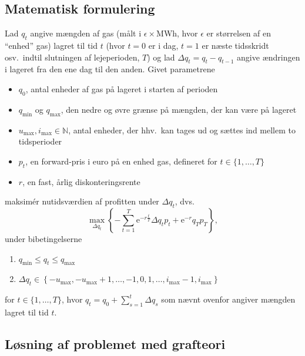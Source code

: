 \documentclass[12pt,oneside,final]{article}
\newcommand{\N}{\mathbb{N}}
\newcommand{\1}{\mathbbm{1}}
\newcommand{\e}{\mathrm{e}}
\begin{document}
\subsection{Matematisk formulering}

Lad \(q_{t}\) angive mængden af gas (målt i \(\epsilon\times\)MWh, hvor \(\epsilon\) er størrelsen af en ``enhed'' gas) lagret til tid \(t\) (hvor \(t = 0\) er i dag, \(t = 1\) er næste tidsskridt osv.\ indtil slutningen af lejeperioden, \(T\)) og lad \(\Delta q_{t} = q_{t} - q_{t-1}\) angive ændringen i lageret fra den ene dag til den anden.
Givet parametrene
%
\begin{itemize}
\item \(q_{0}\), antal enheder af gas på lageret i starten af perioden
\item \(q_{\min}\) og \(q_{\max}\), den nedre og øvre grænse på mængden, der kan være på lageret
\item \(u_{\max}, i_{\max} \in \N\), antal enheder, der hhv.\ kan tages ud og sættes ind mellem to tidsperioder
\item \(p_{t}\), en forward-pris i euro på en enhed gas, defineret for \(t \in \{1, \dotsc, T\}\)
\item \(r\), en fast, årlig diskonteringsrente
\end{itemize}
%
maksimér nutidsværdien af profitten under \(\Delta q_{t}\), dvs.\
%
\begin{equation}
  \label{eq:1}
  \max_{\Delta q_{t}}
  \left\{
    - \sum_{t = 1}^{T} \e^{-r\tfrac{t}{T}} \Delta q_{t} p_{t} + \e^{-r} q_{T} p_{T}
  \right\} ,
\end{equation}
under bibetingelserne
\begin{enumerate}
\item \(q_{\min} \leq q_{t} \leq q_{\max}\)
\item \(\Delta q_{t} \in
    \left\{
    -u_{\max}, -u_{\max}+1, \dotsc, -1, 0, 1, \dotsc, i_{\max} - 1, i_{\max}
    \right\}\)
\end{enumerate}
%
for \(t \in \{1, \dotsc, T\}\), hvor \(q_{t} = q_{0} + \sum_{s = 1}^{t} \Delta q_{s}\) som nævnt ovenfor angiver mængden lagret til tid \(t\).


\clearpage
\subsection{Løsning af problemet med grafteori}
\end{document}
